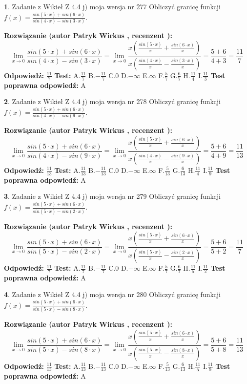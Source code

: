 \documentclass[12pt, a4paper]{article}
\theoremstyle{definition} %
\newtheorem{zad}{}
\newcommand{\zadStart}[1]{\begin{zad}#1\newline}
\newcommand{\zadStop}{\end{zad}}
\newcommand{\rozwStart}[2]{\noindent \textbf{Rozwiązanie (autor #1 , recenzent #2): }\newline}
\newcommand{\rozwStop}{\newline}
\newcommand{\odpStart}{\noindent \textbf{Odpowiedź:}\newline}
\newcommand{\odpStop}{\newline}
\newcommand{\testStart}{\noindent \textbf{Test:}\newline}
\newcommand{\testStop}{\newline}
\newcommand{\kluczStart}{\noindent \textbf{Test poprawna odpowiedź:}\newline}
\newcommand{\kluczStop}{\newline}
\begin{document}
\zadStart{Zadanie z Wikieł Z 4.4 j) moja wersja nr 277}
Obliczyć granicę funkcji $f(x)=\frac{sin(5\cdot x) +sin(6\cdot x)}{sin(4\cdot x) -sin(3\cdot x)}$.
\zadStop
\rozwStart{Patryk Wirkus}{}
$$\lim\limits_{x\to 0}\frac{sin(5\cdot x) +sin(6\cdot x)}{sin(4\cdot x) -sin(3\cdot x)}=\lim\limits_{x\to 0}\frac{x(\frac{sin(5\cdot x)}{x}+\frac{sin(6\cdot x)}{x})}{x(\frac{sin(4\cdot x)}{x}-\frac{sin(3\cdot x)}{x})}=\frac{5+6}{4+3} = \frac{11}{7}$$
\rozwStop
\odpStart
$\frac{11}{7}$
\odpStop
\testStart
A.$\frac{11}{7}$
B.$-\frac{11}{7}$
C.$0$
D.$-\infty$
E.$\infty$
F.$\frac{5}{7}$
G.$\frac{6}{7}$
H.$\frac{11}{4}$
I.$\frac{11}{3}$
\testStop
\kluczStart
A
\kluczStop



\zadStart{Zadanie z Wikieł Z 4.4 j) moja wersja nr 278}
Obliczyć granicę funkcji $f(x)=\frac{sin(5\cdot x) +sin(6\cdot x)}{sin(4\cdot x) -sin(9\cdot x)}$.
\zadStop
\rozwStart{Patryk Wirkus}{}
$$\lim\limits_{x\to 0}\frac{sin(5\cdot x) +sin(6\cdot x)}{sin(4\cdot x) -sin(9\cdot x)}=\lim\limits_{x\to 0}\frac{x(\frac{sin(5\cdot x)}{x}+\frac{sin(6\cdot x)}{x})}{x(\frac{sin(4\cdot x)}{x}-\frac{sin(9\cdot x)}{x})}=\frac{5+6}{4+9} = \frac{11}{13}$$
\rozwStop
\odpStart
$\frac{11}{13}$
\odpStop
\testStart
A.$\frac{11}{13}$
B.$-\frac{11}{13}$
C.$0$
D.$-\infty$
E.$\infty$
F.$\frac{5}{13}$
G.$\frac{6}{13}$
H.$\frac{11}{4}$
I.$\frac{11}{9}$
\testStop
\kluczStart
A
\kluczStop



\zadStart{Zadanie z Wikieł Z 4.4 j) moja wersja nr 279}
Obliczyć granicę funkcji $f(x)=\frac{sin(5\cdot x) +sin(6\cdot x)}{sin(5\cdot x) -sin(2\cdot x)}$.
\zadStop
\rozwStart{Patryk Wirkus}{}
$$\lim\limits_{x\to 0}\frac{sin(5\cdot x) +sin(6\cdot x)}{sin(5\cdot x) -sin(2\cdot x)}=\lim\limits_{x\to 0}\frac{x(\frac{sin(5\cdot x)}{x}+\frac{sin(6\cdot x)}{x})}{x(\frac{sin(5\cdot x)}{x}-\frac{sin(2\cdot x)}{x})}=\frac{5+6}{5+2} = \frac{11}{7}$$
\rozwStop
\odpStart
$\frac{11}{7}$
\odpStop
\testStart
A.$\frac{11}{7}$
B.$-\frac{11}{7}$
C.$0$
D.$-\infty$
E.$\infty$
F.$\frac{5}{7}$
G.$\frac{6}{7}$
H.$\frac{11}{5}$
I.$\frac{11}{2}$
\testStop
\kluczStart
A
\kluczStop



\zadStart{Zadanie z Wikieł Z 4.4 j) moja wersja nr 280}
Obliczyć granicę funkcji $f(x)=\frac{sin(5\cdot x) +sin(6\cdot x)}{sin(5\cdot x) -sin(8\cdot x)}$.
\zadStop
\rozwStart{Patryk Wirkus}{}
$$\lim\limits_{x\to 0}\frac{sin(5\cdot x) +sin(6\cdot x)}{sin(5\cdot x) -sin(8\cdot x)}=\lim\limits_{x\to 0}\frac{x(\frac{sin(5\cdot x)}{x}+\frac{sin(6\cdot x)}{x})}{x(\frac{sin(5\cdot x)}{x}-\frac{sin(8\cdot x)}{x})}=\frac{5+6}{5+8} = \frac{11}{13}$$
\rozwStop
\odpStart
$\frac{11}{13}$
\odpStop
\testStart
A.$\frac{11}{13}$
B.$-\frac{11}{13}$
C.$0$
D.$-\infty$
E.$\infty$
F.$\frac{5}{13}$
G.$\frac{6}{13}$
H.$\frac{11}{5}$
I.$\frac{11}{8}$
\testStop
\kluczStart
A
\kluczStop
\end{document}
